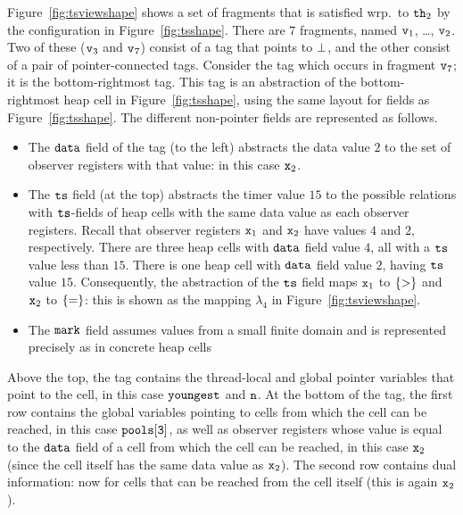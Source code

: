 Figure~\ref{fig:tsviewshape} shows a set of fragments that is
satisfied wrp.\ to ${\tt th}_2$ by the configuration in Figure~\ref{fig:tsshape}.
There are $7$ fragments, named $\mathtt{v}_1$, \ldots , $\mathtt{v}_2$. Two of
these ($\mathtt{v}_3$ and $\mathtt{v}_7$) consist of a tag that points to $\bot$,
and the other consist of a pair of pointer-connected tags.
Consider the tag which occurs in fragment $\mathtt{v}_7$; it is the bottom-rightmost
tag. This tag is an abstraction of the
bottom-rightmost heap cell in Figure~\ref{fig:tsshape}, using the same layout
for fields as Figure~\ref{fig:tsshape}. The different non-pointer fields
are represented as follows.
\begin{itemize}
\item The $\tt data$ field of the tag (to the left) abstracts the data value
  $2$ to the set of observer registers with that value: in this case
  $\mathtt{x}_2$.
\item The $\tt ts$ field (at the top) abstracts the timer value $15$ to
  the possible relations with $\tt ts$-fields of heap cells with the same
  data value as each observer registers. Recall that observer registers
  $\mathtt{x}_1$ and $\mathtt{x}_2$ have values $4$ and $2$, respectively. There are
  three heap cells with $\tt data$ field value $4$, all with a $\tt ts$
  value less than $15$. There is one heap cell with
  $\tt data$ field value $2$, having $\tt ts$ value $15$.
  Consequently, the abstraction of the $\tt ts$ field maps $\mathtt{x}_1$ to
  $\left\{>\right\}$ and $\mathtt{x}_2$ to $\left\{=\right\}$: this is shown as the mapping
  $\lambda_4$ in Figure~\ref{fig:tsviewshape}.
\item The $\tt mark$ field assumes values from a small finite domain and
  is represented precisely as in concrete heap cells
\end{itemize}
Above the top, the tag contains the thread-local and global pointer variables
that point to the cell, in this case $\tt youngest$ and $\tt n$.
At the bottom of the tag, the first row contains the global variables 
pointing to cells from which the cell can be reached, in this case
$\tt pools[3]$, as well as observer registers whose value is equal to the
${\tt data}$ field of a cell from which  the cell can be reached, in this
case $\mathtt{x}_2$ (since the cell itself has the same data value as $\mathtt{x}_2$).
The second row contains dual information: now for cells that can be reached
from the cell itself (this is again $\mathtt{x}_2$).




